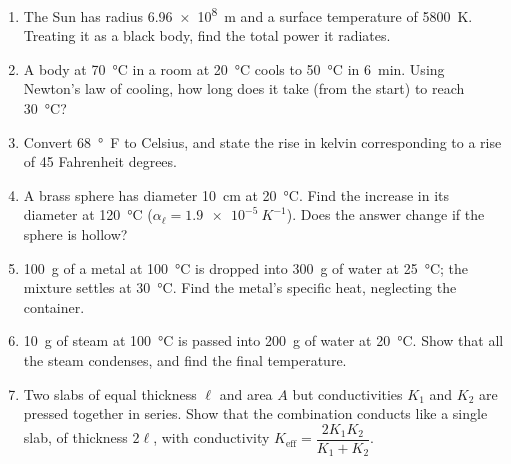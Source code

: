 \begin{enumerate}[itemsep=3pt]
      \emph{air} temperatures inside and outside are \SI{20}{\celsius} and \SI{5}{\celsius}?
\item The Sun has radius \SI{6.96e8}{m} and a surface temperature of \SI{5800}{K}. Treating it as a
      black body, find the total power it radiates.
\item A body at \SI{70}{\celsius} in a room at \SI{20}{\celsius} cools to \SI{50}{\celsius} in
      \SI{6}{min}. Using Newton's law of cooling, how long does it take (from the start) to reach
      \SI{30}{\celsius}?
\item Convert \SI{68}{\degree F} to Celsius, and state the rise in kelvin corresponding to a rise of
      45 Fahrenheit degrees.
\item A brass sphere has diameter \SI{10}{cm} at \SI{20}{\celsius}. Find the increase in its diameter at
      \SI{120}{\celsius} ($\alpha_\ell = \SI{1.9e-5}{K^{-1}}$). Does the answer change if the sphere is
      hollow?
\item \SI{100}{g} of a metal at \SI{100}{\celsius} is dropped into \SI{300}{g} of water at
      \SI{25}{\celsius}; the mixture settles at \SI{30}{\celsius}. Find the metal's specific heat,
      neglecting the container.
\item \SI{10}{g} of steam at \SI{100}{\celsius} is passed into \SI{200}{g} of water at \SI{20}{\celsius}.
      Show that all the steam condenses, and find the final temperature.
\item Two slabs of equal thickness $\ell$ and area $A$ but conductivities $K_1$ and $K_2$ are pressed
      together in series. Show that the combination conducts like a single slab, of thickness $2\ell$, with
      conductivity $K_{\text{eff}} = \dfrac{2K_1K_2}{K_1+K_2}$.
\end{enumerate}

